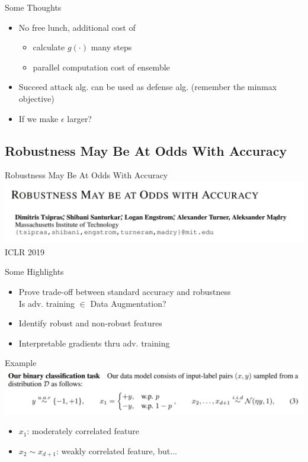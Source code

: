 \documentclass{beamer}
\begin{document}
\begin{frame}{Some Thoughts}
  \begin{itemize}
    \item No free lunch, additional cost of
      \begin{itemize}
        \item calculate $g(\cdot)$ many steps
        \item parallel computation cost of ensemble
      \end{itemize}
    \item Succeed attack alg. can be used as defense alg. (remember the minmax objective)
    \item If we make $\epsilon$ larger?
  \end{itemize}
\end{frame}

\subsection{Robustness May Be At Odds With Accuracy}
\begin{frame}{Robustness May Be At Odds With Accuracy}
  \includegraphics[width=\textwidth]{fig/p2/title.png}
  \center ICLR 2019
\end{frame}

\begin{frame}{Some Highlights}
  \begin{itemize}
    \item Prove trade-off between standard accuracy and robustness \\
      Is adv. training $\in$ Data Augmentation?
    \item Identify robust and non-robust features
    \item Interpretable gradients thru adv. training
  \end{itemize}
\end{frame}

\begin{frame}{Example}
  \includegraphics[width=\textwidth]{fig/p2/example.png}
  \begin{itemize}
    \item $x_1$: moderately correlated feature
    \item $x_2 \sim x_{d+1}$: weakly correlated feature, but...
  \end{itemize} 
\end{frame}
\end{document}
